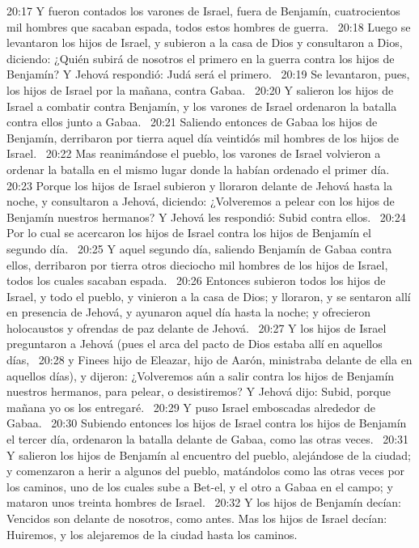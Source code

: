 20:17 Y fueron contados los varones de Israel, fuera de Benjamín, cuatrocientos mil hombres que sacaban espada, todos estos hombres de guerra.  
20:18 Luego se levantaron los hijos de Israel, y subieron a la casa de Dios y consultaron a Dios, diciendo: ¿Quién subirá de nosotros el primero en la guerra contra los hijos de Benjamín? Y Jehová respondió: Judá será el primero.  
20:19 Se levantaron, pues, los hijos de Israel por la mañana, contra Gabaa.  
20:20 Y salieron los hijos de Israel a combatir contra Benjamín, y los varones de Israel ordenaron la batalla contra ellos junto a Gabaa.  
20:21 Saliendo entonces de Gabaa los hijos de Benjamín, derribaron por tierra aquel día veintidós mil hombres de los hijos de Israel.  
20:22 Mas reanimándose el pueblo, los varones de Israel volvieron a ordenar la batalla en el mismo lugar donde la habían ordenado el primer día.  
20:23 Porque los hijos de Israel subieron y lloraron delante de Jehová hasta la noche, y consultaron a Jehová, diciendo: ¿Volveremos a pelear con los hijos de Benjamín nuestros hermanos? Y Jehová les respondió: Subid contra ellos.  
20:24 Por lo cual se acercaron los hijos de Israel contra los hijos de Benjamín el segundo día.  
20:25 Y aquel segundo día, saliendo Benjamín de Gabaa contra ellos, derribaron por tierra otros dieciocho mil hombres de los hijos de Israel, todos los cuales sacaban espada.  
20:26 Entonces subieron todos los hijos de Israel, y todo el pueblo, y vinieron a la casa de Dios; y lloraron, y se sentaron allí en presencia de Jehová, y ayunaron aquel día hasta la noche; y ofrecieron holocaustos y ofrendas de paz delante de Jehová.  
20:27 Y los hijos de Israel preguntaron a Jehová (pues el arca del pacto de Dios estaba allí en aquellos días,  
20:28 y Finees hijo de Eleazar, hijo de Aarón, ministraba delante de ella en aquellos días), y dijeron: ¿Volveremos aún a salir contra los hijos de Benjamín nuestros hermanos, para pelear, o desistiremos? Y Jehová dijo: Subid, porque mañana yo os los entregaré.  
20:29 Y puso Israel emboscadas alrededor de Gabaa.  
20:30 Subiendo entonces los hijos de Israel contra los hijos de Benjamín el tercer día, ordenaron la batalla delante de Gabaa, como las otras veces.  
20:31 Y salieron los hijos de Benjamín al encuentro del pueblo, alejándose de la ciudad; y comenzaron a herir a algunos del pueblo, matándolos como las otras veces por los caminos, uno de los cuales sube a Bet-el, y el otro a Gabaa en el campo; y mataron unos treinta hombres de Israel.  
20:32 Y los hijos de Benjamín decían: Vencidos son delante de nosotros, como antes. Mas los hijos de Israel decían: Huiremos, y los alejaremos de la ciudad hasta los caminos.  
